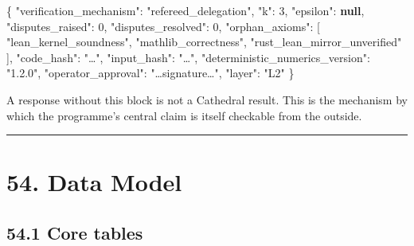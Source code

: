 \documentclass[
  11pt]{report}
\newenvironment{Shaded}{}{}
\newcommand{\DataTypeTok}[1]{\textcolor[rgb]{0.56,0.13,0.00}{#1}}
\newcommand{\DecValTok}[1]{\textcolor[rgb]{0.25,0.63,0.44}{#1}}
\newcommand{\FunctionTok}[1]{\textcolor[rgb]{0.02,0.16,0.49}{#1}}
\newcommand{\KeywordTok}[1]{\textcolor[rgb]{0.00,0.44,0.13}{\textbf{#1}}}
\newcommand{\OtherTok}[1]{\textcolor[rgb]{0.00,0.44,0.13}{#1}}
\newcommand{\StringTok}[1]{\textcolor[rgb]{0.25,0.44,0.63}{#1}}
\begin{document}
\begin{Shaded}
\begin{Highlighting}[]
\FunctionTok{\{}
  \DataTypeTok{"verification\_mechanism"}\FunctionTok{:} \StringTok{"refereed\_delegation"}\FunctionTok{,}
  \DataTypeTok{"k"}\FunctionTok{:} \DecValTok{3}\FunctionTok{,}
  \DataTypeTok{"epsilon"}\FunctionTok{:} \KeywordTok{null}\FunctionTok{,}
  \DataTypeTok{"disputes\_raised"}\FunctionTok{:} \DecValTok{0}\FunctionTok{,}
  \DataTypeTok{"disputes\_resolved"}\FunctionTok{:} \DecValTok{0}\FunctionTok{,}
  \DataTypeTok{"orphan\_axioms"}\FunctionTok{:} \OtherTok{[}
    \StringTok{"lean\_kernel\_soundness"}\OtherTok{,}
    \StringTok{"mathlib\_correctness"}\OtherTok{,}
    \StringTok{"rust\_lean\_mirror\_unverified"}
  \OtherTok{]}\FunctionTok{,}
  \DataTypeTok{"code\_hash"}\FunctionTok{:} \StringTok{"…"}\FunctionTok{,}
  \DataTypeTok{"input\_hash"}\FunctionTok{:} \StringTok{"…"}\FunctionTok{,}
  \DataTypeTok{"deterministic\_numerics\_version"}\FunctionTok{:} \StringTok{"1.2.0"}\FunctionTok{,}
  \DataTypeTok{"operator\_approval"}\FunctionTok{:} \StringTok{"…signature…"}\FunctionTok{,}
  \DataTypeTok{"layer"}\FunctionTok{:} \StringTok{"L2"}
\FunctionTok{\}}
\end{Highlighting}
\end{Shaded}

A response without this block is not a Cathedral result. This is the
mechanism by which the programme's central claim is itself checkable
from the outside.

\begin{center}\rule{0.5\linewidth}{0.5pt}\end{center}

\hypertarget{data-model}{%
\chapter{54. Data Model}\label{data-model}}

\hypertarget{core-tables}{%
\section{54.1 Core tables}\label{core-tables}}
\end{document}
